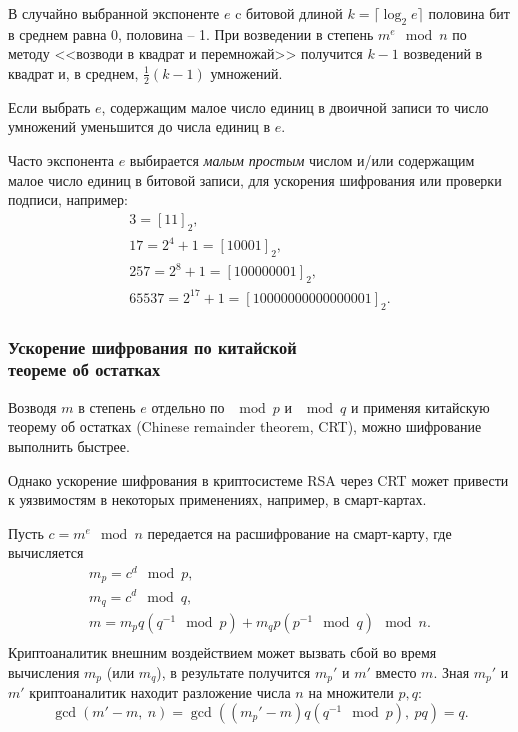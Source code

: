 В случайно выбранной экспоненте $e$ c битовой длиной $k = \lceil \log_2 e \rceil$ половина бит в среднем равна 0, половина -- 1. При возведении в степень $m^e \mod n$ по методу <<возводи в квадрат и перемножай>> получится $k-1$ возведений в квадрат и, в среднем,
 $\frac{1}{2}(k-1)$ умножений.

Если выбрать $e$, содержащим малое число единиц в двоичной записи то число умножений уменьшится до числа единиц в $e$.

Часто экспонента $e$ выбирается  \emph{малым} \emph{простым} числом и/или содержащим малое число единиц в битовой записи, для ускорения шифрования или проверки подписи, например:
\[
    \begin{array}{l}
        3 = [11]_2, \\
        17 = 2^4+1 = [10001]_2, \\
        257 = 2^8+1 = [100000001]_2, \\
        65537 = 2^{17}+1 = [10000000000000001]_2.
    \end{array}
\]



\subsubsection[Ускорение шифрования]{Ускорение шифрования по китайской \protect\\ теореме об остатках}

Возводя $m$ в степень $e$ отдельно по $\mod p$ и $\mod q$ и применяя китайскую теорему об остатках (Chinese remainder theorem, CRT), можно шифрование выполнить быстрее.

Однако ускорение шифрования в криптосистеме RSA через CRT может привести к уязвимостям в некоторых применениях, например, в смарт-картах.

\example
Пусть $c = m^e \mod n$ передается на расшифрование на смарт-карту, где вычисляется
\[ \begin{array}{c}
    m_p = c^d \mod p, \\
    m_q = c^d \mod q, \\
    m = m_p q (q^{-1} \mod p) + m_q p (p^{-1} \mod q) \mod n. \\
\end{array} \]
Криптоаналитик внешним воздействием может вызвать сбой во время вычисления $m_p$ (или $m_q$), в результате получится $m_p'$ и $m'$ вместо $m$. Зная $m_p'$ и $m'$ криптоаналитик находит разложение числа $n$ на множители $p,q$:
    \[ \gcd(m' - m, ~ n) = \gcd( (m_p' - m) q (q^{-1} \mod p), ~ pq) = q. \]
\exampleend


